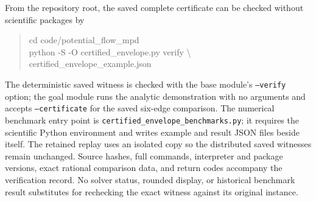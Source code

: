 From the repository root, the saved complete certificate can be checked
without scientific packages by
\begin{quote}\small\ttfamily
cd code/potential\_flow\_mpd\\
python -S -O certified\_envelope.py verify \textbackslash\\
\hspace*{1em}certified\_envelope\_example.json
\end{quote}
The deterministic saved witness is checked with the base module's
\texttt{--verify} option; the goal module runs the analytic demonstration
with no arguments and accepts \texttt{--certificate} for the saved
six-edge comparison. The numerical benchmark entry point is
\texttt{certified\_envelope\_benchmarks.py}; it requires the scientific
Python environment and writes example and result JSON files beside
itself. The retained replay uses an isolated copy so the distributed
saved witnesses remain unchanged. Source hashes, full commands,
interpreter and package versions, exact rational comparison data,
and return codes accompany the verification record. No solver status,
rounded display, or historical benchmark result substitutes for
rechecking the exact witness against its original instance.
